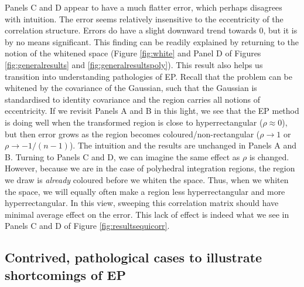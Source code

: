 \documentclass[twoside,11pt]{article}
\begin{document}
Panels C and D appear to have a much flatter error, which perhaps disagrees with intuition.  The error seems relatively insensitive to the eccentricity of the correlation structure.  Errors do have a slight downward trend towards 0, but it is by no means significant.  This finding can be readily explained by returning to the notion of the whitened space (Figure \ref{fig:white} and Panel D of Figures \ref{fig:generalresults} and \ref{fig:generalresultspoly}).  This result also helps us transition into understanding pathologies of EP.  Recall that the problem can be whitened by the covariance of the Gaussian, such that the Gaussian is standardised to identity covariance and the region carries all notions of eccentricity.  If we revisit Panels A and B in this light, we see that the EP method is doing well when the transformed region is close to hyperrectangular ($\rho \approx 0$), but then error grows as the region becomes coloured/non-rectangular ($\rho \rightarrow 1$ or $\rho \rightarrow -1/(n-1)$).   The intuition and the results are unchanged in Panels A and B.  Turning to Panels C and D, we can imagine the same effect as $\rho$ is changed.  However, because we are in the case of polyhedral integration regions, the region we draw is \emph{already} coloured before we whiten the space.  Thus, when we whiten the space, we will equally often make a region less hyperrectangular and more hyperrectangular.  In this view, sweeping this correlation matrix should have minimal average effect on the error.  This lack of effect is indeed what we see in Panels C and D of Figure \ref{fig:resultsequicorr}.  

\subsection{Contrived, pathological cases to illustrate shortcomings of EP}
\label{sec:pathologicalresults}
\end{document}
